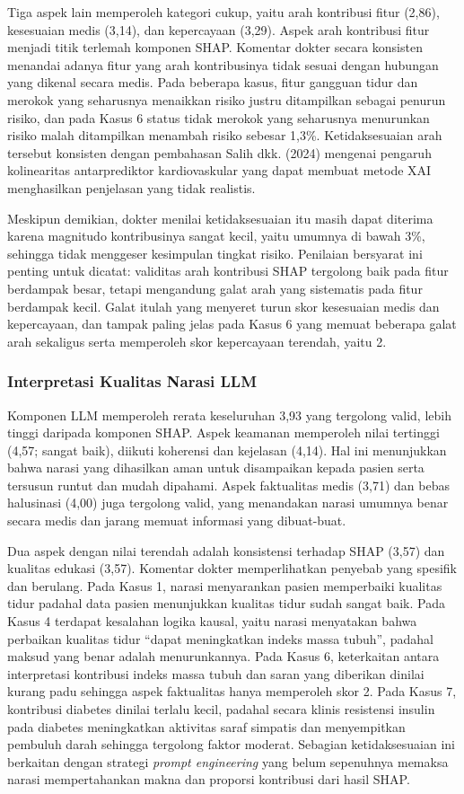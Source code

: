 Tiga aspek lain memperoleh kategori cukup, yaitu arah kontribusi fitur (2,86),
kesesuaian medis (3,14), dan kepercayaan (3,29). Aspek arah kontribusi fitur menjadi
titik terlemah komponen SHAP. Komentar dokter secara konsisten menandai adanya fitur
yang arah kontribusinya tidak sesuai dengan hubungan yang dikenal secara medis. Pada
beberapa kasus, fitur gangguan tidur dan merokok yang seharusnya menaikkan risiko
justru ditampilkan sebagai penurun risiko, dan pada Kasus 6 status tidak merokok yang
seharusnya menurunkan risiko malah ditampilkan menambah risiko sebesar 1,3\%.
Ketidaksesuaian arah tersebut konsisten dengan pembahasan Salih dkk. (2024) mengenai
pengaruh kolinearitas antarprediktor kardiovaskular yang dapat membuat metode XAI
menghasilkan penjelasan yang tidak realistis.

Meskipun demikian, dokter menilai ketidaksesuaian itu masih dapat diterima karena
magnitudo kontribusinya sangat kecil, yaitu umumnya di bawah 3\%, sehingga tidak
menggeser kesimpulan tingkat risiko. Penilaian bersyarat ini penting untuk dicatat:
validitas arah kontribusi SHAP tergolong baik pada fitur berdampak besar, tetapi
mengandung galat arah yang sistematis pada fitur berdampak kecil. Galat itulah yang
menyeret turun skor kesesuaian medis dan kepercayaan, dan tampak paling jelas pada
Kasus 6 yang memuat beberapa galat arah sekaligus serta memperoleh skor kepercayaan
terendah, yaitu 2.

\subsubsection{Interpretasi Kualitas Narasi LLM}
Komponen LLM memperoleh rerata keseluruhan 3,93 yang tergolong valid, lebih tinggi
daripada komponen SHAP. Aspek keamanan memperoleh nilai tertinggi (4,57; sangat baik),
diikuti koherensi dan kejelasan (4,14). Hal ini menunjukkan bahwa narasi yang
dihasilkan aman untuk disampaikan kepada pasien serta tersusun runtut dan mudah
dipahami. Aspek faktualitas medis (3,71) dan bebas halusinasi (4,00) juga tergolong
valid, yang menandakan narasi umumnya benar secara medis dan jarang memuat informasi
yang dibuat-buat.

Dua aspek dengan nilai terendah adalah konsistensi terhadap SHAP (3,57) dan kualitas
edukasi (3,57). Komentar dokter memperlihatkan penyebab yang spesifik dan berulang.
Pada Kasus 1, narasi menyarankan pasien memperbaiki kualitas tidur padahal data pasien
menunjukkan kualitas tidur sudah sangat baik. Pada Kasus 4 terdapat kesalahan logika
kausal, yaitu narasi menyatakan bahwa perbaikan kualitas tidur ``dapat meningkatkan
indeks massa tubuh'', padahal maksud yang benar adalah menurunkannya. Pada Kasus 6,
keterkaitan antara interpretasi kontribusi indeks massa tubuh dan saran yang diberikan
dinilai kurang padu sehingga aspek faktualitas hanya memperoleh skor 2. Pada Kasus 7,
kontribusi diabetes dinilai terlalu kecil, padahal secara klinis resistensi insulin
pada diabetes meningkatkan aktivitas saraf simpatis dan menyempitkan pembuluh darah
sehingga tergolong faktor moderat. Sebagian ketidaksesuaian ini berkaitan dengan
strategi \emph{prompt engineering} yang belum sepenuhnya memaksa narasi mempertahankan
makna dan proporsi kontribusi dari hasil SHAP.

